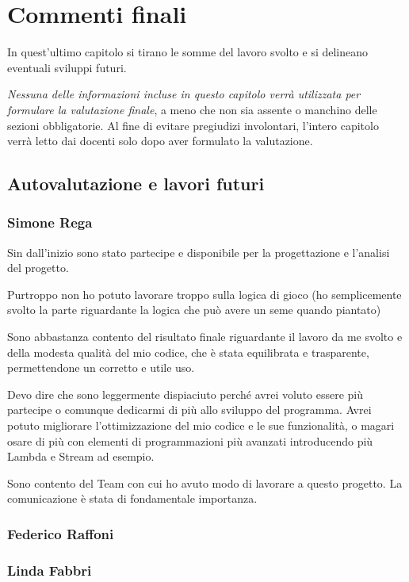 \documentclass[a4paper,12pt]{report}
\begin{document}
\chapter{Commenti finali}

In quest'ultimo capitolo si tirano le somme del lavoro svolto e si delineano eventuali sviluppi
futuri.

\textit{Nessuna delle informazioni incluse in questo capitolo verrà utilizzata per formulare la valutazione finale}, a meno che non sia assente o manchino delle sezioni obbligatorie.
%
Al fine di evitare pregiudizi involontari, l'intero capitolo verrà letto dai docenti solo dopo aver formulato la valutazione.

\section{Autovalutazione e lavori futuri}

\subsection{Simone Rega}
Sin dall'inizio sono stato partecipe e disponibile per la progettazione e l'analisi del progetto. 

Purtroppo non ho potuto lavorare troppo sulla logica di gioco (ho semplicemente svolto la parte riguardante la logica che può avere un seme quando piantato)

Sono abbastanza contento del risultato finale riguardante il lavoro da me svolto e della modesta qualità del mio codice, che è stata equilibrata e trasparente, permettendone un corretto e utile uso.

Devo dire che sono leggermente dispiaciuto perché avrei voluto essere più partecipe o comunque dedicarmi di più allo sviluppo del programma. Avrei potuto migliorare l'ottimizzazione del mio codice e le sue funzionalità, o magari osare di più con elementi di programmazioni più avanzati introducendo più Lambda e Stream ad esempio. 

Sono contento del Team con cui ho avuto modo di lavorare a questo progetto. La comunicazione è stata di fondamentale importanza.

\subsection{Federico Raffoni}
\subsection{Linda Fabbri}
\end{document}
